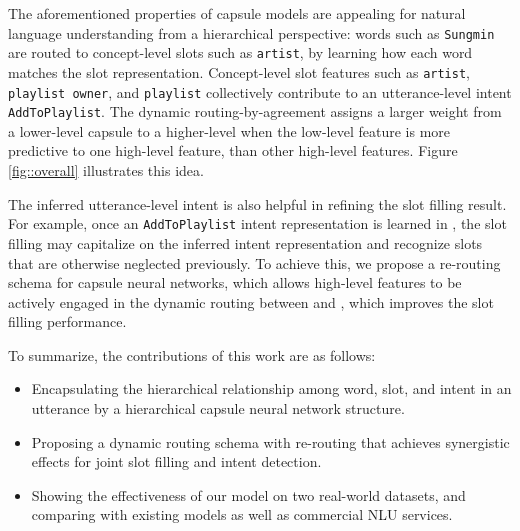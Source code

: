 The aforementioned properties of capsule models are appealing for natural language understanding from a hierarchical perspective: words such as \texttt{Sungmin} are routed to concept-level slots such as \texttt{artist}, by learning how each word matches the slot representation. Concept-level slot features such as \texttt{artist}, \texttt{playlist owner}, and \texttt{playlist} collectively contribute to an utterance-level intent \texttt{AddToPlaylist}. The dynamic routing-by-agreement assigns a larger weight from a lower-level capsule to a higher-level when the low-level feature is more predictive to one high-level feature, than other high-level features. Figure \ref{fig::overall} illustrates this idea.

The inferred utterance-level intent is also helpful in refining the slot filling result. For example, once an \texttt{AddToPlaylist} intent representation is learned in {\ThirdCapsule}, the slot filling may capitalize on the inferred intent representation and recognize slots that are otherwise neglected previously.
To achieve this, we propose a re-routing schema for capsule neural networks, which allows high-level features to be actively engaged in the dynamic routing between {\FirstCapsule} and {\SecondCapsule}, which improves the slot filling performance.

To summarize, the contributions of this work are as follows:
\begin{itemize}
    \item Encapsulating the hierarchical relationship among word, slot, and intent in an utterance by a hierarchical capsule neural network structure.
    \item Proposing a dynamic routing schema with re-routing that achieves synergistic effects for joint slot filling and intent detection.
    \item Showing the effectiveness of our model on two real-world datasets, and comparing with existing models as well as commercial NLU services.
\end{itemize}